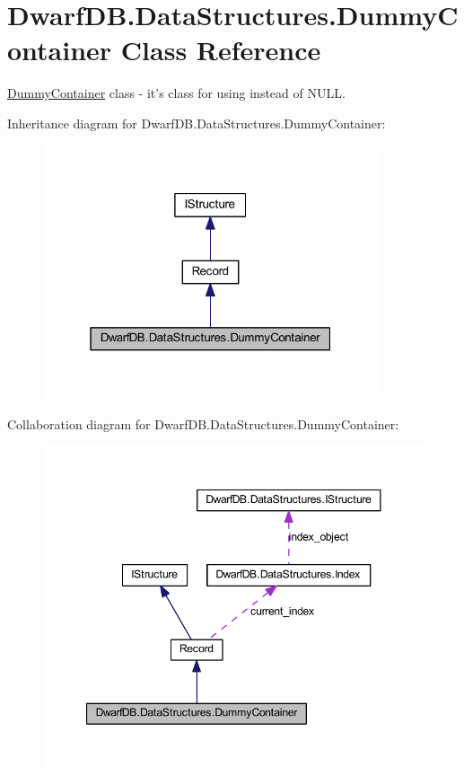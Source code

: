 \hypertarget{class_dwarf_d_b_1_1_data_structures_1_1_dummy_container}{
\section{DwarfDB.DataStructures.DummyContainer Class Reference}
\label{class_dwarf_d_b_1_1_data_structures_1_1_dummy_container}
}


\hyperlink{class_dwarf_d_b_1_1_data_structures_1_1_dummy_container}{DummyContainer} class -\/ it's class for using instead of NULL.  




Inheritance diagram for DwarfDB.DataStructures.DummyContainer:
\nopagebreak
\begin{figure}[H]
\begin{center}
\leavevmode
\includegraphics[width=280pt]{class_dwarf_d_b_1_1_data_structures_1_1_dummy_container__inherit__graph}
\end{center}
\end{figure}


Collaboration diagram for DwarfDB.DataStructures.DummyContainer:
\nopagebreak
\begin{figure}[H]
\begin{center}
\leavevmode
\includegraphics[width=347pt]{class_dwarf_d_b_1_1_data_structures_1_1_dummy_container__coll__graph}
\end{center}
\end{figure}
